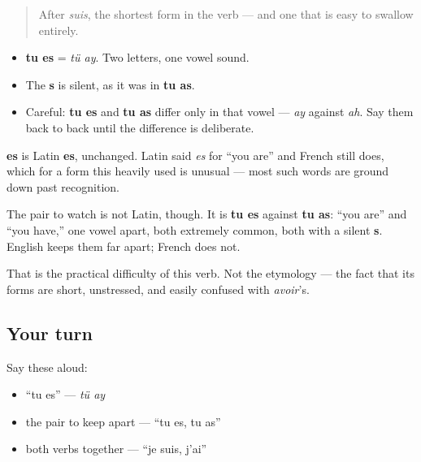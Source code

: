 \label{lesson:FR-C16-es}



\begin{quote}
After \emph{suis}, the shortest form in the verb — and one that is easy to swallow entirely.
\end{quote}

\begin{sounds}
\begin{itemize}
\raggedright
  \item \textbf{tu es} = \emph{tü ay}. Two letters, one vowel sound.
  \item The \textbf{s} is silent, as it was in \textbf{tu as}.
  \item Careful: \textbf{tu es} and \textbf{tu as} differ only in that vowel — \emph{ay} against \emph{ah}. Say them back to back until the difference is deliberate.
\end{itemize}
\end{sounds}

\begin{cousinweb}
\textbf{es} is Latin \textbf{es}, unchanged. Latin said \emph{es} for \textquotedblleft{}you are\textquotedblright{} and French still does, which for a form this heavily used is unusual — most such words are ground down past recognition.

The pair to watch is not Latin, though. It is \textbf{tu es} against \textbf{tu as}: \textquotedblleft{}you are\textquotedblright{} and \textquotedblleft{}you have,\textquotedblright{} one vowel apart, both extremely common, both with a silent \textbf{s}. English keeps them far apart; French does not.

That is the practical difficulty of this verb. Not the etymology — the fact that its forms are short, unstressed, and easily confused with \emph{avoir}'s.
\end{cousinweb}

\subsection*{Your turn}
Say these aloud:

\begin{itemize}
\raggedright
  \item \textquotedblleft{}tu es\textquotedblright{} — \emph{tü ay}
  \item the pair to keep apart — \textquotedblleft{}tu es, tu as\textquotedblright{}
  \item both verbs together — \textquotedblleft{}je suis, j'ai\textquotedblright{}
\end{itemize}

